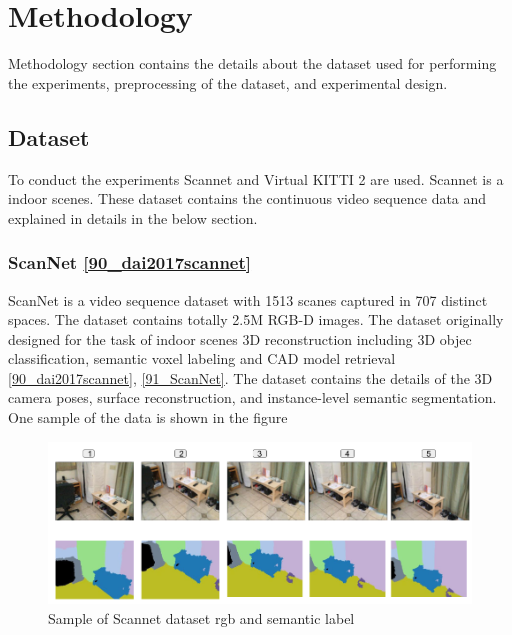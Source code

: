 

    \chapter{Methodology}
	\label{chap:methodology}
	
	Methodology section contains the details about the dataset used for performing the experiments, preprocessing of the dataset, and experimental design.

    \section{Dataset}
    
    To conduct the experiments Scannet and Virtual KITTI 2 are used. Scannet is a indoor scenes. These dataset contains the continuous video sequence data and explained in details in the below section. 
    
    \subsection{ScanNet \ref{90_dai2017scannet}}
    
    ScanNet is a video sequence dataset with 1513 scanes captured in 707 distinct spaces. The dataset contains totally 2.5M RGB-D images. The dataset originally designed for the task of indoor scenes 3D reconstruction including 3D objec classification, semantic voxel labeling and CAD model retrieval \ref{90_dai2017scannet}, \ref{91_ScanNet}. The dataset contains the details of the 3D camera poses, surface reconstruction, and instance-level semantic segmentation. One sample of the data is shown in the figure     

	\begin{figure}[h]
		\centering
		\includegraphics[width=17cm]{images/images_segm_scannet.png}
		\caption{Sample of Scannet dataset rgb and semantic label}
		\label{fig:sample_rgb_seg_scannet}
	\end{figure}
	
